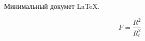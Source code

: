 \documentclass{article}
\begin{document}
Минимальный докумет \LaTeX.

$$ F=\frac{R^2}{R^2_t} $$
\end{document}
